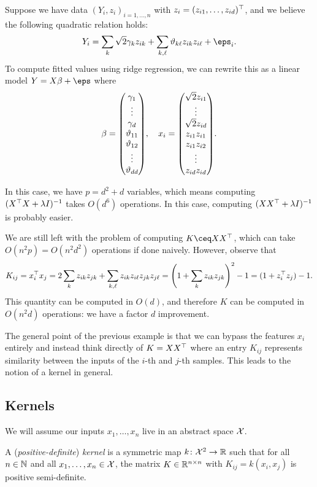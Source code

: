 \begin{example}
    Suppose we have data $(Y_i, z_i)_{i = 1, \dotsc, n}$ with $z_i = (z_{i1}, \dotsc, z_{id})^\top$, and we believe the following quadratic relation holds:
    \[
    Y_i = \sum_k \sqrt{2}\gamma_k z_{ik}  + \sum_{k, \ell} \theta_{k\ell} z_{ik} z_{i\ell} + \eps_i.
    \]
    To compute fitted values using ridge regression, we can rewrite this as a linear model $Y = X\beta + \eps$ where
    \[
    \beta = \mqty(\gamma_1 \\ \vdots \\ \gamma_d \\ \theta_{11} \\ \theta_{12} \\ \vdots \\ \theta_{dd}), \quad x_i = \mqty(\sqrt{2} z_{i1} \\ \vdots \\ \sqrt 2 z_{id} \\ z_{i1} z_{i1} \\ z_{i1}z_{i2} \\ \vdots \\ z_{id}z_{id}).
    \]
    
    In this case, we have $p = d^2 + d$ variables, which means computing $(X^\top X + \lambda I)^{-1}$ takes $O(d^6)$ operations. In this case, computing $(XX^\top + \lambda I)^{-1}$ is probably easier. 
    
    We are still left with the problem of computing $K \ceq XX\T$, which can take $O(n^2 p) = O(n^2 d^2)$ operations if done naively. However, observe that
    \[
    K_{ij} = x_i^\top x_j = 2 \sum_k z_{ik} z_{jk} + \sum_{k, \ell} z_{ik} z_{i\ell} z_{jk} z_{j\ell} = \qty( 1 + \sum_k z_{ik} z_{jk})^2 - 1 = (1 + z_i^\top z_j) - 1.
    \]
    This quantity can be computed in $O(d)$, and therefore $K$ can be computed in $O(n^2 d)$ operations: we have a factor $d$ improvement. 
\end{example}

The general point of the previous example is that we can bypass the features $x_i$ entirely and instead think directly of $K = XX^\top$ where an entry $K_{ij}$ represents similarity between the inputs of the $i$-th and $j$-th samples. This leads to the notion of a kernel in general.

\subsection{Kernels}
We will assume our inputs $x_1, \dotsc, x_n$ live in an abstract space $\mathcal X$. 
\begin{definition}
    A (\emph{positive-definite}) \emph{kernel} is a symmetric map $k \colon \mathcal X^2 \to \mathbb R$ such that for all $n \in \mathbb N$ and all $x_1, \dotsc, x_n \in \mathcal X$, the matrix $K \in \mathbb R^{n \times n}$ with $K_{ij} = k(x_i, x_j)$ is positive semi-definite. 
\end{definition}

